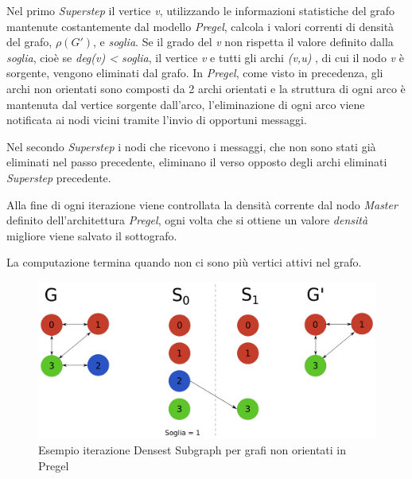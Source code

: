 \documentclass[LaM,binding=0.6cm]{sapthesis}
\begin{document}
Nel primo \textit{Superstep} il vertice \textit{v}, utilizzando le informazioni statistiche del grafo mantenute costantemente dal modello \textit{Pregel}, calcola i valori correnti di densità del grafo, $\rho(G')$, e \textit{soglia}. Se il grado del \textit{v} non rispetta il valore definito dalla \textit{soglia}, cioè se \textit{deg(v) < soglia}, il vertice \textit{v} e tutti gli archi \textit{(v,u)} , di cui il nodo \textit{v} è sorgente, vengono eliminati dal grafo. 
In \textit{Pregel}, come visto in precedenza, gli archi non orientati sono composti da 2 archi orientati e la struttura di ogni arco è mantenuta dal vertice sorgente dall'arco, l'eliminazione di ogni arco viene notificata ai nodi vicini tramite l'invio di opportuni messaggi.
  
Nel secondo \textit{Superstep} i nodi che ricevono i messaggi, che non sono stati già eliminati nel passo precedente, eliminano il verso opposto degli archi eliminati \textit{Superstep} precedente.

Alla fine di ogni iterazione viene controllata la densità corrente dal nodo \textit{Master} definito dell'architettura \textit{Pregel}, ogni volta che si ottiene un valore \textit{densità} migliore viene salvato il sottografo. 

La computazione termina quando non ci sono più vertici attivi nel grafo.

\begin{minipage}{\linewidth}

\end{minipage}


\begin{figure}
\centering
 \includegraphics[width=1\textwidth]{PREGEL-denesestU}
\caption{Esempio iterazione Densest Subgraph per grafi non orientati in Pregel}
\label{fig:PREGELDENSESETU}
\end{figure}
\end{document}
